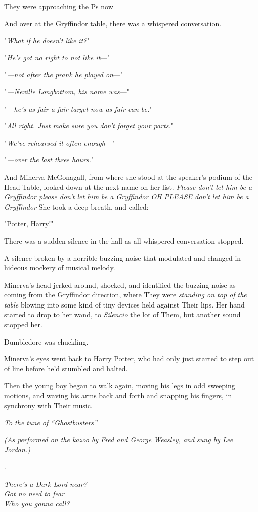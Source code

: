They were approaching the Ps now{\el}

And over at the Gryffindor table, there was a whispered conversation.

"\emph{What if he doesn't like it?}"

"\emph{He's got no right to not like it}—"

"\emph{—not after the prank he played on}—"

"\emph{—Neville Longbottom, his name was}—"

"\emph{—he's as fair a fair target now as fair can be.}"

"\emph{All right. Just make sure you don't forget your parts.}"

"\emph{We've rehearsed it often enough}—"

"\emph{—over the last three hours.}"

And Minerva McGonagall, from where she stood at the speaker's podium of the
Head Table, looked down at the next name on her list. \emph{Please don't let
him be a Gryffindor please don't let him be a Gryffindor OH PLEASE don't let
him be a Gryffindor{\el}} She took a deep breath, and called:

"Potter, Harry!"

There was a sudden silence in the hall as all whispered conversation stopped.

A silence broken by a horrible buzzing noise that modulated and changed in
hideous mockery of musical melody.

Minerva's head jerked around, shocked, and identified the buzzing noise as
coming from the Gryffindor direction, where They were \emph{standing on top of
the table} blowing into some kind of tiny devices held against Their lips. Her
hand started to drop to her wand, to \emph{Silencio} the lot of Them, but
another sound stopped her.

Dumbledore was chuckling.

Minerva's eyes went back to Harry Potter, who had only just started to step out
of line before he'd stumbled and halted.

Then the young boy began to walk again, moving his legs in odd sweeping
motions, and waving his arms back and forth and snapping his fingers, in
synchrony with Their music.

\begin{center}
\emph{To the tune of ``Ghostbusters''}

\emph{(As performed on the kazoo by Fred and George Weasley,
and sung by Lee Jordan.)}

.

\emph{There's a Dark Lord near?\\
Got no need to fear\\
Who you gonna call?}
\end{center}

